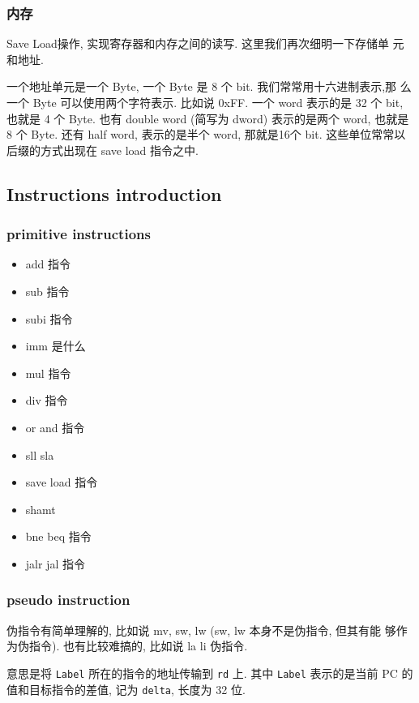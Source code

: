 \documentclass[11pt]{article}
\begin{document}
\subsubsection{内存}
\label{sec:org8e86807}

Save Load操作, 实现寄存器和内存之间的读写. 这里我们再次细明一下存储单
元和地址. 

一个地址单元是一个 Byte, 一个 Byte 是 8 个 bit. 我们常常用十六进制表示,那
么一个 Byte 可以使用两个字符表示. 比如说 0xFF. 一个 word 表示的是 32
个 bit, 也就是 4 个 Byte. 也有 double word (简写为 dword) 表示的是两个
word, 也就是 8 个 Byte. 还有 half word, 表示的是半个 word, 那就是16个
bit. 这些单位常常以后缀的方式出现在 save load 指令之中. 


\subsection{Instructions introduction}
\label{sec:org6c4ef60}
\subsubsection{primitive instructions}
\label{sec:org7096a0f}

\begin{itemize}
\item add 指令
\item sub 指令
\item subi 指令
\item imm 是什么
\item mul 指令
\item div 指令
\item or and 指令
\item sll sla
\item save load 指令
\item shamt
\item bne beq 指令
\item jalr jal 指令
\end{itemize}

\subsubsection{pseudo instruction}
\label{sec:org767f2a1}
伪指令有简单理解的, 比如说 mv, sw, lw (sw, lw 本身不是伪指令, 但其有能
够作为伪指令). 也有比较难搞的, 比如说 la li 伪指令.

意思是将 \texttt{Label} 所在的指令的地址传输到 \texttt{rd} 上. 其中 \texttt{Label} 表示的是当前 PC 的值和目标指令的差值, 记为 \texttt{delta}, 长度为 32 位. 
\end{document}
